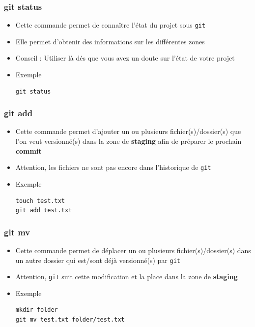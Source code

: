 \documentclass{beamer}
\begin{document}
\begin{frame}[fragile]
\frametitle{git status}

\begin{itemize}
\item Cette commande permet de connaître l'état du projet sous \texttt{git}
\item Elle permet d'obtenir des informations sur les différentes zones
\item Conseil : Utiliser là dés que vous avez un doute sur l'état de votre projet
\item Exemple
\begin{lstlisting}
git status
\end{lstlisting}
\end{itemize}
\end{frame}

\begin{frame}[fragile]
\frametitle{git add}

\begin{itemize}
\item Cette commande permet d'ajouter un ou plusieurs fichier(s)/dossier(s) que l'on veut versionné(s) dans la zone de \textbf{staging} afin de préparer le prochain \textbf{commit}
\item Attention, les fichiers ne sont pas encore dans l'historique de \texttt{git}
\item Exemple
\begin{lstlisting}
touch test.txt
git add test.txt
\end{lstlisting}
\end{itemize}
\end{frame}

\begin{frame}[fragile]
\frametitle{git mv}

\begin{itemize}
\item Cette commande permet de déplacer un ou plusieurs fichier(s)/dossier(s) dans un autre dossier qui est/sont déjà versionné(s) par \texttt{git}
\item Attention, \texttt{git} suit cette modification et la place dans la zone de \textbf{staging}
\item Exemple
\begin{lstlisting}
mkdir folder
git mv test.txt folder/test.txt
\end{lstlisting}
\end{itemize}
\end{frame}
\end{document}
